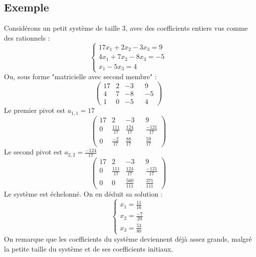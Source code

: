 \documentclass[french]{article}
\begin{document}
\subsection{Exemple}
Considérons un petit système de taille 3, avec des coefficients entiers vus comme des rationnels :
\begin{equation*}
	\begin{cases}
		17 x_1 + 2 x_2 - 3 x_3 = 9\\
		4 x_1 + 7 x_2 - 8 x_3 = -5\\
		x_1 - 5 x_3 = 4
	\end{cases}
\end{equation*}
Ou, sous forme "matricielle avec second membre" :
\begin{equation*}
	\begin{pmatrix}
		17 & 2 & -3 & & 9\\
		4 & 7 & -8 & & -5\\
		1 & 0 & -5 & & 4
	\end{pmatrix}
\end{equation*}
Le premier pivot est $a_{1,1} = 17$
\begin{equation*}
	\begin{pmatrix}
		17 & 2 & -3 & & 9\\
		0 & \frac{111}{17} & \frac{124}{17} & & \frac{-121}{17}\\
		0 & \frac{-2}{17} & \frac{88}{17} & & \frac{59}{17}
	\end{pmatrix}
\end{equation*}
Le second pivot est $a_{2,2} = \frac{-124}{17}$
\begin{equation*}
	\begin{pmatrix}
		17 & 2 & -3 & & 9\\
		0 & \frac{111}{17} & \frac{124}{17} & & \frac{-121}{17}\\
		0 & 0 & \frac{560}{111} & & \frac{371}{111}
	\end{pmatrix}
\end{equation*}
Le système est échelonné. On en déduit sa solution :
\begin{equation*}
	\begin{cases}
		x_1 = \frac{11}{16}\\
		x_2 = \frac{-7}{20}\\
		x_3 = \frac{53}{80}
	\end{cases}
\end{equation*}
On remarque que les coefficients du système deviennent déjà assez grands, malgré la petite taille du système et de ses coefficients initiaux.
\end{document}
